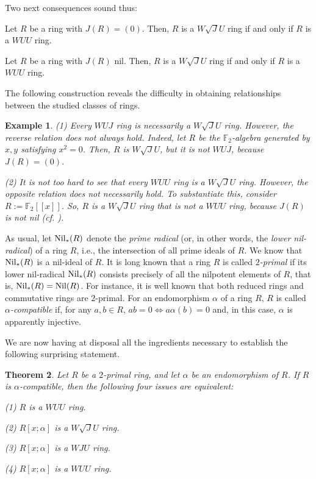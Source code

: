 \documentclass[12pt]{amsart}
\newtheorem{theorem}{Theorem}[section] \newtheorem{mtheorem}[theorem]{Main Theorem}
\newtheorem{example}[theorem]{Example} \newtheorem{definition}[theorem]{Definition}
\begin{document}
Two next consequences sound thus:

\begin{corollary} Let $R$ be a ring with $J(R)=(0)$. Then, $R$ is a $W\sqrt{J}U$ ring if and only if $R$ is a
$WUU$ ring.
\end{corollary}

\begin{corollary} Let $R$ be a ring with $J(R)$ nil. Then, $R$ is a $W\sqrt{J}U$ ring if and only if $R$ is a
$WUU$ ring.
\end{corollary}

The following construction reveals the difficulty in obtaining relationships between the studied classes of rings.

\begin{example} (1) Every $WUJ$ ring is necessarily a $W\sqrt{J}U$ ring. However, the reverse relation
does {\it not} always hold. Indeed, let $R$ be the $\mathbb{F}_2$-algebra generated by $x,y$ satisfying $x^2=0$. Then, $R$ is $W\sqrt{J}U$, but it is {\it not} $WUJ$, because $J(R)=(0)$.

(2) It is not too hard to see that every $WUU$ ring is a $W\sqrt{J}U$ ring. However, the opposite relation does {\it not} necessarily hold. To substantiate this, consider $R := \mathbb{F}_2[[x]]$. So, $R$ is a $W\sqrt{J}U$ ring that is not a $WUU$ ring, because $J(R)$ is not nil (cf. \cite{wuu}).
\end{example}

As usual, let ${\rm Nil}_{*}(R)$ denote the {\it prime radical} (or, in other words, the {\it lower nil-radical}) of a ring $R$, i.e., the intersection of all prime ideals of $R$. We know that ${\rm Nil}_{*}(R)$ is a nil-ideal of $R$. It is long known that a ring $R$ is called {\it $2$-primal} if its lower nil-radical ${\rm Nil}_{*}(R)$ consists precisely of all the nilpotent elements of $R$, that is, ${\rm Nil}_{*}(R)={\rm Nil}(R)$. For instance, it is well known that both reduced rings and commutative rings are  $2$-primal. For an
endomorphism $\alpha$ of a ring $R$, $R$ is called {\it $\alpha$-compatible} if, for any $a,b\in R$,
$ab=0\Longleftrightarrow a\alpha (b)=0$ and, in this case, $\alpha$ is apparently injective.

\medskip

We are now having at disposal all the ingredients necessary to establish the following surprising statement.

\begin{theorem} Let \( R \) be a \(2\)-primal ring, and let \( \alpha \) be an endomorphism of \( R \). If \( R \) is \( \alpha \)-compatible, then the following four issues are equivalent:

(1) $R$ is a $WUU$ ring. 	

(2) $R[x; \alpha]$ is a $W\sqrt{J}U$ ring. 	

(3) $R[x; \alpha]$ is a $WJU$ ring.
	
(4) $R[x; \alpha]$ is a $WUU$ ring.
\end{theorem}
\end{document}
